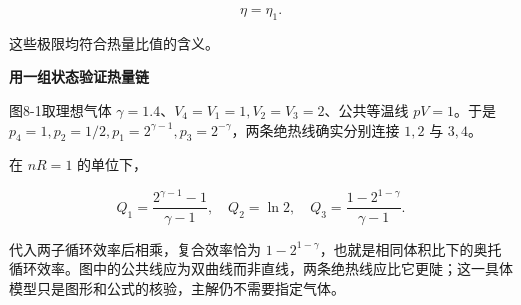 \documentclass[12pt,a4paper,UTF8]{ctexart}
\begin{document}
\[\eta=\eta_1.\]

这些极限均符合热量比值的含义。

\textbf{用一组状态验证热量链}

图8-1取理想气体 \(\gamma=1.4\)、\(V_4=V_1=1,V_2=V_3=2\)、公共等温线
\(pV=1\)。于是
\(p_4=1,p_2=1/2,p_1=2^{\gamma-1},p_3=2^{-\gamma}\)，两条绝热线确实分别连接
\(1,2\) 与 \(3,4\)。

在 \(nR=1\) 的单位下，

\[Q_1=\frac{2^{\gamma-1}-1}{\gamma-1},\quad
Q_2=\ln2,\quad
Q_3=\frac{1-2^{1-\gamma}}{\gamma-1}.\]

代入两子循环效率后相乘，复合效率恰为
\(1-2^{1-\gamma}\)，也就是相同体积比下的奥托循环效率。图中的公共线应为双曲线而非直线，两条绝热线应比它更陡；这一具体模型只是图形和公式的核验，主解仍不需要指定气体。
\end{document}
